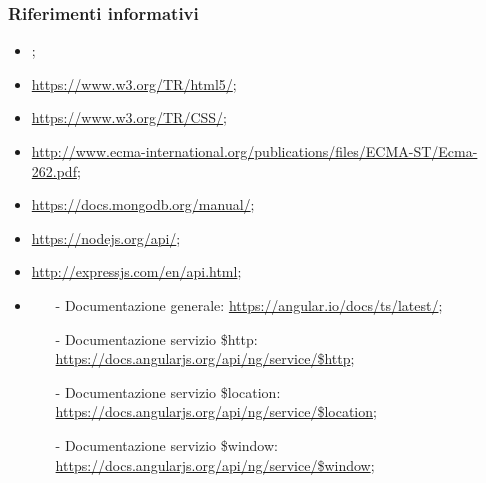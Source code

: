 \documentclass[a4paper, titlepage]{article}
\begin{document}
	\subsubsection{Riferimenti informativi}
	\begin{itemize}

	\item {} \Gldoc;
	
	\item {} \newline \url{https://www.w3.org/TR/html5/};
	
	\item {} \newline \url{https://www.w3.org/TR/CSS/};
	
	\item {} \newline \url{http://www.ecma-international.org/publications/files/ECMA-ST/Ecma-262.pdf};
	
	\item {} \newline \url{https://docs.mongodb.org/manual/};
	
	\item {} \newline \url{https://nodejs.org/api/};
	
	\item {} \newline \url{http://expressjs.com/en/api.html};
	
	\item {}
	 	\begin{itemize}
	 	 \item[-] Documentazione generale:  \newline \url{https://angular.io/docs/ts/latest/};
	 	 \item[-] Documentazione servizio \$http: \newline \url{https://docs.angularjs.org/api/ng/service/$http};
	 	 \item[-] Documentazione servizio \$location:  \newline\url{https://docs.angularjs.org/api/ng/service/$location};
	 	 \item[-] Documentazione servizio \$window: \newline \url{https://docs.angularjs.org/api/ng/service/$window};
	 	\end{itemize}
	

\end{itemize}
\end{document}
